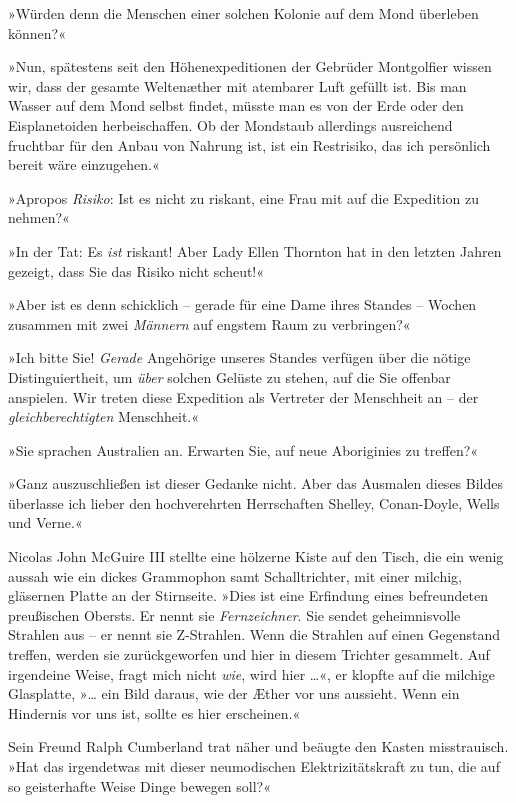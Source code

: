 »Würden denn die Menschen einer solchen Kolonie auf dem Mond
überleben können?«

»Nun, spätestens seit den Höhenexpeditionen der Gebrüder
Montgolfier wissen wir, dass der gesamte Weltenæther mit atembarer
Luft gefüllt ist. Bis man Wasser auf dem Mond selbst findet, müsste
man es von der Erde oder den Eisplanetoiden herbeischaffen. Ob der
Mondstaub allerdings ausreichend fruchtbar für den Anbau von
Nahrung ist, ist ein Restrisiko, das ich persönlich bereit wäre
einzugehen.«

»Apropos \emph{Risiko}: Ist es nicht zu riskant, eine Frau mit auf
die Expedition zu nehmen?«

»In der Tat: Es \emph{ist} riskant! Aber Lady Ellen Thornton hat in
den letzten Jahren gezeigt, dass Sie das Risiko nicht scheut!«

»Aber ist es denn schicklich – gerade für eine Dame ihres Standes –
Wochen zusammen mit zwei \emph{Männern} auf engstem Raum zu
verbringen?«

»Ich bitte Sie! \emph{Gerade} Angehörige unseres Standes verfügen
über die nötige Distinguiertheit, um \emph{über} solchen Gelüste zu
stehen, auf die Sie offenbar anspielen. Wir treten diese Expedition
als Vertreter der Menschheit an – der \emph{gleichberechtigten}
Menschheit.«

»Sie sprachen Australien an. Erwarten Sie, auf neue Aboriginies zu
treffen?«

»Ganz auszuschließen ist dieser Gedanke nicht. Aber das Ausmalen
dieses Bildes überlasse ich lieber den hochverehrten Herrschaften
Shelley, Conan-Doyle, Wells und Verne.«

\tb

Nicolas John McGuire III stellte eine hölzerne Kiste auf den Tisch,
die ein wenig aussah wie ein dickes Grammophon samt Schalltrichter,
mit einer milchig, gläsernen Platte an der Stirnseite. »Dies ist
eine Erfindung eines befreundeten preußischen Obersts. Er nennt sie
\emph{Fernzeichner}. Sie sendet geheimnisvolle Strahlen aus – er
nennt sie Z-Strahlen. Wenn die Strahlen auf einen Gegenstand
treffen, werden sie zurückgeworfen und hier in diesem Trichter
gesammelt. Auf irgendeine Weise, fragt mich nicht \emph{wie}, wird
hier …«, er klopfte auf die milchige Glasplatte, »… ein Bild
daraus, wie der Æther vor uns aussieht. Wenn ein Hindernis vor uns
ist, sollte es hier erscheinen.«

Sein Freund Ralph Cumberland trat näher und beäugte den Kasten
misstrauisch. »Hat das irgendetwas mit dieser neumodischen
Elektrizitätskraft zu tun, die auf so geisterhafte Weise Dinge
bewegen soll?«

